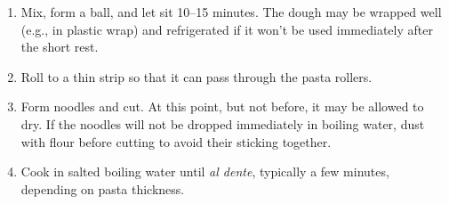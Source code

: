 
\begin{ingredients}
\end{ingredients}


\begin{recipe}
  \begin{enumerate}

  \item Mix, form a ball, and let sit 10--15 minutes.  The dough may
    be wrapped well (e.g., in plastic wrap) and refrigerated if it
    won't be used immediately after the short rest.

  \item Roll to a thin strip so that it can pass through the pasta
    rollers.

  \item Form noodles and cut.  At this point, but not before, it may
    be allowed to dry.  If the noodles will not be dropped immediately
    in boiling water, dust with flour before cutting to avoid their
    sticking together.

  \item Cook in salted boiling water until \textit{al dente},
    typically a few minutes, depending on pasta thickness.

  \end{enumerate}
\end{recipe}
